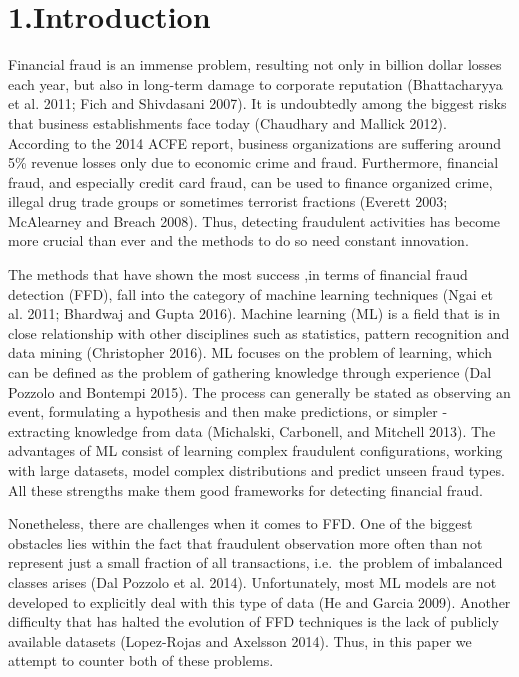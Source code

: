 \documentclass[12pt,]{article}
\begin{document}

\hypertarget{introduction}{%
\section{1.Introduction}\label{introduction}}

Financial fraud is an immense problem, resulting not only in billion
dollar losses each year, but also in long-term damage to corporate
reputation (Bhattacharyya et al. 2011; Fich and Shivdasani 2007). It is
undoubtedly among the biggest risks that business establishments face
today (Chaudhary and Mallick 2012). According to the 2014 ACFE report,
business organizations are suffering around 5\% revenue losses only due
to economic crime and fraud. Furthermore, financial fraud, and
especially credit card fraud, can be used to finance organized crime,
illegal drug trade groups or sometimes terrorist fractions (Everett
2003; McAlearney and Breach 2008). Thus, detecting fraudulent activities
has become more crucial than ever and the methods to do so need constant
innovation.

The methods that have shown the most success ,in terms of financial
fraud detection (FFD), fall into the category of machine learning
techniques (Ngai et al. 2011; Bhardwaj and Gupta 2016). Machine learning
(ML) is a field that is in close relationship with other disciplines
such as statistics, pattern recognition and data mining (Christopher
2016). ML focuses on the problem of learning, which can be defined as
the problem of gathering knowledge through experience (Dal Pozzolo and
Bontempi 2015). The process can generally be stated as observing an
event, formulating a hypothesis and then make predictions, or simpler -
extracting knowledge from data (Michalski, Carbonell, and Mitchell
2013). The advantages of ML consist of learning complex fraudulent
configurations, working with large datasets, model complex distributions
and predict unseen fraud types. All these strengths make them good
frameworks for detecting financial fraud.

Nonetheless, there are challenges when it comes to FFD. One of the
biggest obstacles lies within the fact that fraudulent observation more
often than not represent just a small fraction of all transactions,
i.e.~the problem of imbalanced classes arises (Dal Pozzolo et al. 2014).
Unfortunately, most ML models are not developed to explicitly deal with
this type of data (He and Garcia 2009). Another difficulty that has
halted the evolution of FFD techniques is the lack of publicly available
datasets (Lopez-Rojas and Axelsson 2014). Thus, in this paper we attempt
to counter both of these problems.
\end{document}
